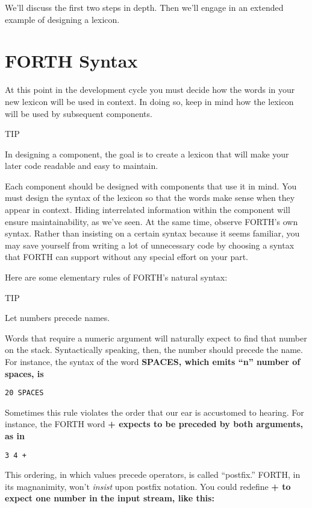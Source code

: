We'll discuss the first two steps in depth. Then we'll engage in an
extended example of designing a lexicon.

\section{FORTH Syntax}

At this point in the development cycle you must decide how the words in
your new lexicon will be used in context. In doing so, keep in mind how
the lexicon will be used by subsequent components.

TIP

In designing a component, the goal is to create a lexicon that will make your
later code readable and easy to maintain.

Each component should be designed with components that use it in mind.
You must design the syntax of the lexicon so that the words make sense
when they appear in context. Hiding interrelated information within the
component will ensure maintainability, as we've seen.
At the same time, observe FORTH's own syntax. Rather than insisting
on a certain syntax because it seems familiar, you may save
yourself from writing a lot of unnecessary code by choosing a syntax that
FORTH can support without any special effort on your part.

Here are some elementary rules of FORTH's natural syntax:

TIP

Let numbers precede names.

Words that require a numeric argument will naturally expect to find that
number on the stack. Syntactically speaking, then, the number should
precede the name. For instance, the syntax of the word \bf{SPACES}, which
emits ``n'' number of spaces, is

\begin{verbatim}
20 SPACES
\end{verbatim}

Sometimes this rule violates the order that our ear is accustomed to
hearing. For instance, the FORTH word \bf{+} expects to be preceded by both
arguments, as in

\begin{verbatim}
3 4 +
\end{verbatim}

This ordering, in which values precede operators, is called ``postfix.''
FORTH, in its magnanimity, won't \emph{insist} upon postfix notation.
You could redefine \bf{+} to expect one number in the input stream, like this:

